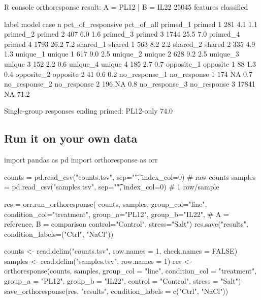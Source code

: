 \documentclass[11pt,a4paper]{article}
\begin{document}
\begin{terminal}{R console}
orthoresponse result: A = PL12 | B = IL22
25045 features classified

         label       model case     n pct_of_responsive pct_of_all
      primed_1      primed    1   281               4.1        1.1
      primed_2      primed    2   407               6.0        1.6
      primed_3      primed    3  1744              25.5        7.0
      primed_4      primed    4  1793              26.2        7.2
      shared_1      shared    1   563               8.2        2.2
      shared_2      shared    2   335               4.9        1.3
      unique_1      unique    1   617               9.0        2.5
      unique_2      unique    2   628               9.2        2.5
      unique_3      unique    3   152               2.2        0.6
      unique_4      unique    4   185               2.7        0.7
    opposite_1    opposite    1    88               1.3        0.4
    opposite_2    opposite    2    41               0.6        0.2
 no_response_1 no_response    1   174                NA        0.7
 no_response_2 no_response    2   196                NA        0.8
 no_response_3 no_response    3 17841                NA       71.2

Single-group responses ending primed: PL12-only 74.0%
\end{terminal}

\subsection{Run it on your own data}

\begin{pycode}
import pandas as pd
import orthoresponse as orr

counts  = pd.read_csv("counts.tsv",  sep="\t", index_col=0)  # raw counts
samples = pd.read_csv("samples.tsv", sep="\t", index_col=0)  # 1 row/sample

res = orr.run_orthoresponse(
    counts, samples,
    group_col="line", condition_col="treatment",
    group_a="PL12", group_b="IL22",        # A = reference, B = comparison
    control="Control", stress="Salt")
res.save("results", condition_labels=("Ctrl", "NaCl"))
\end{pycode}

\begin{rcode}
counts  <- read.delim("counts.tsv",  row.names = 1, check.names = FALSE)
samples <- read.delim("samples.tsv", row.names = 1)
res <- orthoresponse(counts, samples,
                     group_col = "line", condition_col = "treatment",
                     group_a = "PL12", group_b = "IL22",
                     control = "Control", stress = "Salt")
save_orthoresponse(res, "results", condition_labels = c("Ctrl", "NaCl"))
\end{rcode}
\end{document}
